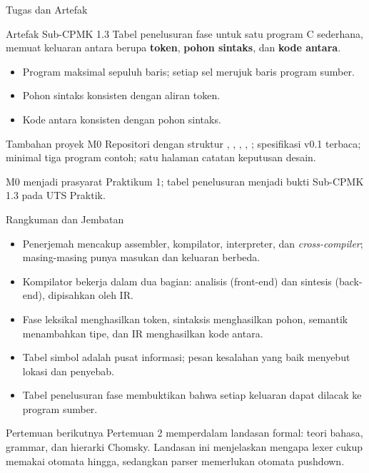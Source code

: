 \documentclass[aspectratio=169,10pt,t]{beamer}
\begin{document}
\begin{frame}{Tugas dan Artefak}
  \begin{block}{Artefak Sub-CPMK 1.3}
    Tabel penelusuran fase untuk satu program C sederhana, memuat
    keluaran antara berupa \textbf{token}, \textbf{pohon sintaks}, dan
    \textbf{kode antara}.
  \end{block}

  \small
  \begin{itemize}
    \item Program maksimal sepuluh baris; setiap sel merujuk baris
          program sumber.
    \item Pohon sintaks konsisten dengan aliran token.
    \item Kode antara konsisten dengan pohon sintaks.
  \end{itemize}

  \vspace{3pt}
  \begin{block}{Tambahan proyek M0}
    \footnotesize
    Repositori dengan struktur , , ,
    , ; spesifikasi v0.1 terbaca; minimal tiga
    program contoh; satu halaman catatan keputusan desain.
  \end{block}

  \vspace{2pt}
  {\footnotesize\color{ubbblue!75}M0 menjadi prasyarat Praktikum 1;
  tabel penelusuran menjadi bukti Sub-CPMK 1.3 pada UTS Praktik.}
\end{frame}

\begin{frame}{Rangkuman dan Jembatan}
  \begin{itemize}
    \item Penerjemah mencakup assembler, kompilator, interpreter, dan
          \textit{cross-compiler}; masing-masing punya masukan dan
          keluaran berbeda.
    \item Kompilator bekerja dalam dua bagian: analisis (front-end) dan
          sintesis (back-end), dipisahkan oleh IR.
    \item Fase leksikal menghasilkan token, sintaksis menghasilkan pohon,
          semantik menambahkan tipe, dan IR menghasilkan kode antara.
    \item Tabel simbol adalah pusat informasi; pesan kesalahan yang baik
          menyebut lokasi dan penyebab.
    \item Tabel penelusuran fase membuktikan bahwa setiap keluaran dapat
          dilacak ke program sumber.
  \end{itemize}

  \vspace{4pt}
  \begin{exampleblock}{Pertemuan berikutnya}
    Pertemuan 2 memperdalam landasan formal: teori bahasa, grammar, dan
    hierarki Chomsky. Landasan ini menjelaskan mengapa lexer cukup
    memakai otomata hingga, sedangkan parser memerlukan otomata pushdown.
  \end{exampleblock}
\end{frame}
\end{document}
